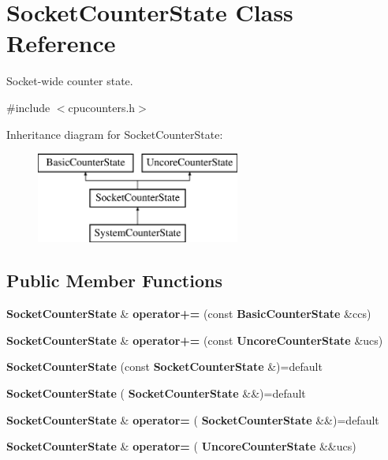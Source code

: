 \section{Socket\+Counter\+State Class Reference}
\label{classSocketCounterState}


Socket-\/wide counter state.  




{\ttfamily \#include $<$cpucounters.\+h$>$}

Inheritance diagram for Socket\+Counter\+State\+:\begin{figure}[H]
\begin{center}
\leavevmode
\includegraphics[height=3.000000cm]{classSocketCounterState}
\end{center}
\end{figure}
\subsection*{Public Member Functions}
\begin{DoxyCompactItemize}
\item 
\mbox{\label{classSocketCounterState_a63321eab07e5e15613ef0ae353323fee}} 
\textbf{ Socket\+Counter\+State} \& {\bfseries operator+=} (const \textbf{ Basic\+Counter\+State} \&ccs)
\item 
\mbox{\label{classSocketCounterState_a7add596cb461d0cf488917921b6c7a47}} 
\textbf{ Socket\+Counter\+State} \& {\bfseries operator+=} (const \textbf{ Uncore\+Counter\+State} \&ucs)
\item 
\mbox{\label{classSocketCounterState_af34f21885498ab389ece2a334b2a00f2}} 
{\bfseries Socket\+Counter\+State} (const \textbf{ Socket\+Counter\+State} \&)=default
\item 
\mbox{\label{classSocketCounterState_aca7766a67d25f38a141304e41837a976}} 
{\bfseries Socket\+Counter\+State} (\textbf{ Socket\+Counter\+State} \&\&)=default
\item 
\mbox{\label{classSocketCounterState_a71bf9211cb66bc3b6d31dc8ff0b7ce90}} 
\textbf{ Socket\+Counter\+State} \& {\bfseries operator=} (\textbf{ Socket\+Counter\+State} \&\&)=default
\item 
\mbox{\label{classSocketCounterState_ad16c195e19c2133f40bcf034527b5c29}} 
\textbf{ Socket\+Counter\+State} \& {\bfseries operator=} (\textbf{ Uncore\+Counter\+State} \&\&ucs)
\end{DoxyCompactItemize}
